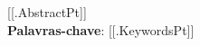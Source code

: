 \begin{resumo}[RESUMO]
\begin{SingleSpacing}

[[.AbstractPt]]\\

\textbf{Palavras-chave}: [[.KeywordsPt]]
\end{SingleSpacing}
\end{resumo}